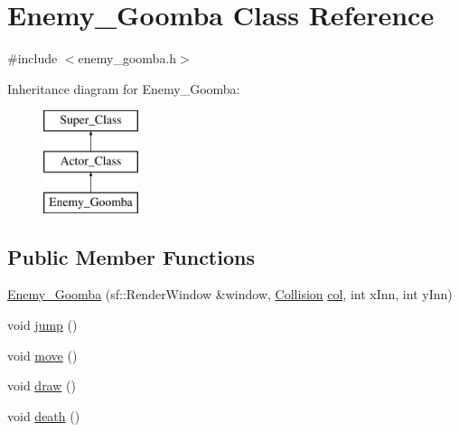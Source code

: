 \hypertarget{class_enemy___goomba}{}\section{Enemy\+\_\+\+Goomba Class Reference}
\label{class_enemy___goomba}


{\ttfamily \#include $<$enemy\+\_\+goomba.\+h$>$}

Inheritance diagram for Enemy\+\_\+\+Goomba\+:\begin{figure}[H]
\begin{center}
\leavevmode
\includegraphics[height=3.000000cm]{class_enemy___goomba}
\end{center}
\end{figure}
\subsection*{Public Member Functions}
\begin{DoxyCompactItemize}
\item 
\hyperlink{class_enemy___goomba_af5a9b3d667381890746453f0dfaa50e6}{Enemy\+\_\+\+Goomba} (sf\+::\+Render\+Window \&window, \hyperlink{class_collision}{Collision} \hyperlink{class_enemy___goomba_a435110bcd5fc30fd2ff0a0d9347c49f3}{col}, int x\+Inn, int y\+Inn)
\item 
void \hyperlink{class_enemy___goomba_ab07621304a0b92c4559679071c060439}{jump} ()
\item 
void \hyperlink{class_enemy___goomba_a0b72ff73bb4f64d4c659a5142862fd1f}{move} ()
\item 
void \hyperlink{class_enemy___goomba_a1947885e29f42889e42947462a9caeb3}{draw} ()
\item 
void \hyperlink{class_enemy___goomba_a09cd52bddf5aa44b94d85adeefa46620}{death} ()
\end{DoxyCompactItemize}
